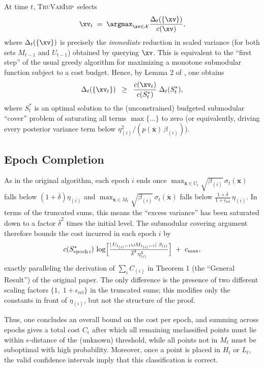 \documentclass[a4paper,10pt]{article}
\newcommand{\TruVarImp}{\textsc{TruVarImp}\xspace}
\newcommand{\xbar}{\mbox{$\overline{\mathbf{x}}$}}
\newcommand{\deltabar}{\overline{\delta}}
\newcommand{\cset}{\mathcal{X}}
\newcommand{\cmax}{c_{\mathrm{max}}}
\begin{document}
At time \(t\), \TruVarImp\ selects
\[
  \xv_t
  \;=\;
  \argmax_{\xv \in \cset}
  \frac{
    \Delta_t(\{\xv\})
  }{
    c(\xv)
  },
\]
where $\Delta_t(\{\xv\})$ is precisely the \emph{immediate} reduction in scaled variance (for both sets $M_{t-1}$ and $U_{t-1}$) obtained by querying $\xv$.
This is equivalent to the “first step” of the usual greedy algorithm for maximizing a monotone submodular function subject to a cost budget.
Hence, by Lemma 2 of \citet{Kra05}, one obtains
\[
  \Delta_t(\{\xv_t\})
  \;\;\ge\;\;
  \frac{c(\xv_t)}{c(S_t^*)}\;
  \Delta_t(S_t^*),
\]
where $S_t^*$ is an optimal solution to the (unconstrained) budgeted submodular “cover” problem of saturating all terms $\max\{\dots\}$ to zero (or equivalently, driving every posterior variance term below $\eta_{(i)}^2 / (p(\xbar)\,\beta_{(i)})$).

\subsection{Epoch Completion}

As in the original algorithm, each epoch $i$ ends once $\max_{\xbar \in U_t} \sqrt{\beta_{(i)}}\,\sigma_{t}(\xbar)$ falls below $(1+\deltabar)\eta_{(i)}$ and $\max_{\xbar \in M_t} \sqrt{\beta_{(i)}}\,\sigma_{t}(\xbar)$ falls below $\tfrac{1+\deltabar}{1+\epsilon_{\mathrm{rel}}}\,\eta_{(i)}$.
In terms of the truncated sums, this means the “excess variance” has been saturated down to a factor $\deltabar^2$ times the initial level.
The submodular covering argument therefore bounds the cost incurred in each epoch $i$ by
\[
   c(S_{\mathrm{epoch}\,i}^*)
   \,\log
   \Bigl[
     \tfrac{
       |\,U_{t_{(i)}-1}\cup M_{t_{(i)}-1}|\;\beta_{(i)}
     }{
       \deltabar^2\, \eta_{(i)}^2
     }
   \Bigr]
   \;+\;
   \cmax,
\]
exactly paralleling the derivation of $\sum_{i} C_{(i)}$ in Theorem 1 (the “General Result”) of the original paper.
The only difference is the presence of two different scaling factors $\{1,\;1+\epsilon_{\mathrm{rel}}\}$ in the truncated sums; this modifies only the constants in front of $\eta_{(i)}$, but not the structure of the proof.

Thus, one concludes an overall bound on the cost per epoch, and summing across epochs gives a total cost $C_{\epsilon}$ after which all remaining unclassified points must lie within $\epsilon$-distance of the (unknown) threshold, while all points not in $M_t$ must be suboptimal with high probability.
Moreover, once a point is placed in $H_t$ or $L_t$, the valid confidence intervals imply that this classification is correct.
\end{document}
